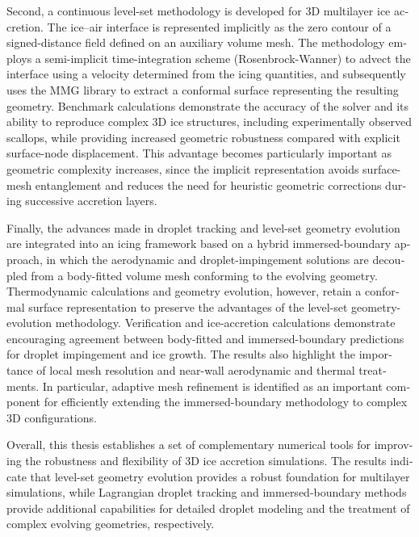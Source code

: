 \begin{otherlanguage}{english}
Second, a continuous level-set methodology is developed for 3D multilayer ice accretion. The ice--air interface is represented implicitly as the zero contour of a signed-distance field defined on an auxiliary volume mesh. The methodology employs a semi-implicit time-integration scheme (Rosenbrock-Wanner) to advect the interface using a velocity determined from the icing quantities, and subsequently uses the MMG library to extract a conformal surface representing the resulting geometry. Benchmark calculations demonstrate the accuracy of the solver and its ability to reproduce complex 3D ice structures, including experimentally observed scallops, while providing increased geometric robustness compared with explicit surface-node displacement. This advantage becomes particularly important as geometric complexity increases, since the implicit representation avoids surface-mesh entanglement and reduces the need for heuristic geometric corrections during successive accretion layers.

Finally, the advances made in droplet tracking and level-set geometry evolution are integrated into an icing framework based on a hybrid immersed-boundary approach, in which the aerodynamic and droplet-impingement solutions are decoupled from a body-fitted volume mesh conforming to the evolving geometry. Thermodynamic calculations and geometry evolution, however, retain a conformal surface representation to preserve the advantages of the level-set geometry-evolution methodology. Verification and ice-accretion calculations demonstrate encouraging agreement between body-fitted and immersed-boundary predictions for droplet impingement and ice growth. The results also highlight the importance of local mesh resolution and near-wall aerodynamic and thermal treatments. In particular, adaptive mesh refinement is identified as an important component for efficiently extending the immersed-boundary methodology to complex 3D configurations.

Overall, this thesis establishes a set of complementary numerical tools for improving the robustness and flexibility of 3D ice accretion simulations. The results indicate that level-set geometry evolution provides a robust foundation for multilayer simulations, while Lagrangian droplet tracking and immersed-boundary methods provide additional capabilities for detailed droplet modeling and the treatment of complex evolving geometries, respectively.

\end{otherlanguage}